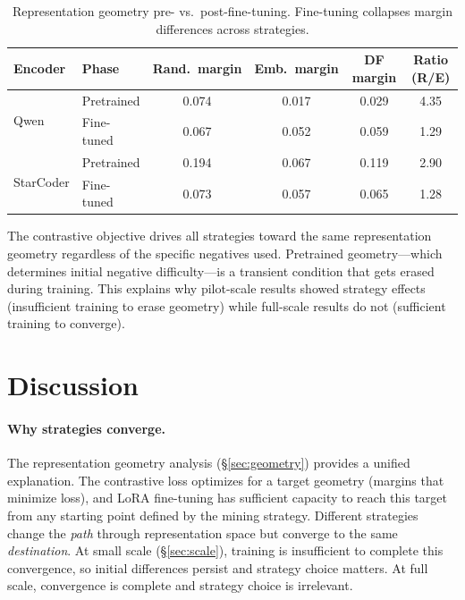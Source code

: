 \documentclass[11pt,a4paper]{article}
\begin{document}
\begin{table}[t]
\centering
\caption{Representation geometry pre- vs.\ post-fine-tuning. Fine-tuning collapses margin differences across strategies.}
\label{tab:geometry}
\small
\begin{tabular}{llcccc}
\toprule
\textbf{Encoder} & \textbf{Phase} & \textbf{Rand.\ margin} & \textbf{Emb.\ margin} & \textbf{DF margin} & \textbf{Ratio (R/E)} \\
\midrule
\multirow{2}{*}{Qwen} & Pretrained & 0.074 & 0.017 & 0.029 & 4.35 \\
 & Fine-tuned & 0.067 & 0.052 & 0.059 & 1.29 \\
\midrule
\multirow{2}{*}{StarCoder} & Pretrained & 0.194 & 0.067 & 0.119 & 2.90 \\
 & Fine-tuned & 0.073 & 0.057 & 0.065 & 1.28 \\
\bottomrule
\end{tabular}
\end{table}

The contrastive objective drives all strategies toward the same representation geometry regardless of the specific negatives used.
Pretrained geometry---which determines initial negative difficulty---is a transient condition that gets erased during training.
This explains why pilot-scale results showed strategy effects (insufficient training to erase geometry) while full-scale results do not (sufficient training to converge).

\section{Discussion}
\label{sec:discussion}

\paragraph{Why strategies converge.}
The representation geometry analysis (\S\ref{sec:geometry}) provides a unified explanation.
The contrastive loss optimizes for a target geometry (margins that minimize loss), and LoRA fine-tuning has sufficient capacity to reach this target from any starting point defined by the mining strategy.
Different strategies change the \emph{path} through representation space but converge to the same \emph{destination}.
At small scale (\S\ref{sec:scale}), training is insufficient to complete this convergence, so initial differences persist and strategy choice matters.
At full scale, convergence is complete and strategy choice is irrelevant.
\end{document}
